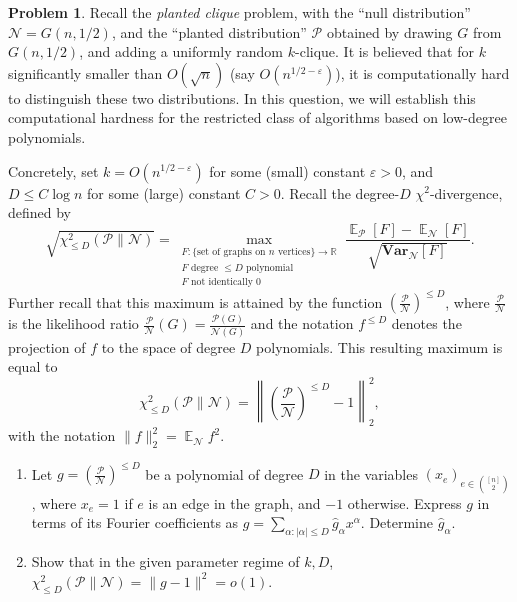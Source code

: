 \documentclass[11pt]{article}
\theoremstyle{definition}
\newtheorem{problem}[theorem]{Problem}
\newcommand{\R}{\mathbb{R}} %
\renewcommand{\epsilon}{\varepsilon}
\newcommand{\eps}{\epsilon}
\DeclareMathOperator{\E}{\mathbb{E}} %
\newcommand{\Var}{\mathbf{Var}}
\newcommand{\wh}[1]{\widehat{#1}}
\begin{document}
\begin{problem}
  Recall the \emph{planted clique} problem, with the ``null distribution'' $\mathcal{N} = G(n,1/2)$, and the ``planted distribution'' $\mathcal{P}$ obtained by drawing $G$ from $G(n,1/2)$, and adding a uniformly random $k$-clique. It is believed that for $k$ significantly smaller than $O(\sqrt{n})$ (say $O(n^{1/2 - \eps})$), it is computationally hard to distinguish these two distributions. In this question, we will establish this computational hardness for the restricted class of algorithms based on low-degree polynomials.

  Concretely, set $k = O(n^{1/2 - \eps})$ for some (small) constant $\eps > 0$, and $D \le C \log n$ for some (large) constant $C > 0$. Recall the degree-$D$ $\chi^2$-divergence, defined by
  \[ \sqrt{ \chi^2_{\le D}\left( \mathcal{P} \| \mathcal{N} \right) } = \max_{\substack{F : \{ \text{set of graphs on $n$ vertices} \} \to \R \\ F \text{ degree $\le D$ polynomial} \\ F \text{ not identically $0$}}} \frac{ \E_{\mathcal{P}}[F] - \E_{\mathcal{N}}[F] }{\sqrt{\Var_{\mathcal{N}}[F]}}. \]
  Further recall that this maximum is attained by the function $\left( \frac{\mathcal{P}}{\mathcal{N}} \right)^{\le D}$, where $\frac{\mathcal{P}}{\mathcal{N}}$ is the likelihood ratio $\frac{\mathcal{P}}{\mathcal{N}}(G) = \frac{\mathcal{P}(G)}{\mathcal{N}(G)}$ and the notation $f^{\le D}$ denotes the projection of $f$ to the space of degree $D$ polynomials. This resulting maximum is equal to
  \[ \chi^2_{\le D} \left( \mathcal{P} \| \mathcal{N} \right) = \left\| \left( \frac{\mathcal{P}}{\mathcal{N}} \right)^{\le D} - 1 \right\|_2^2, \]
  with the notation $\|f\|_2^2 = \E_{\mathcal{N}} f^2$.

  \begin{enumerate}[label=(\alph*)]
    \item Let $g = \left( \frac{\mathcal{P}}{\mathcal{N}} \right)^{\le D}$ be a polynomial of degree $D$ in the variables $(x_e)_{e \in \binom{[n]}{2}}$, where $x_e = 1$ if $e$ is an edge in the graph, and $-1$ otherwise. Express $g$ in terms of its Fourier coefficients as $g = \sum_{\alpha : |\alpha| \le D} \wh{g}_{\alpha} x^\alpha$. Determine $\wh{g}_\alpha$.
    \item Show that in the given parameter regime of $k,D$, $\chi^2_{\le D}\left( \mathcal{P} \| \mathcal{N} \right) = \|g - 1\|^2 = o(1)$.
  \end{enumerate}
\end{problem}
\end{document}
